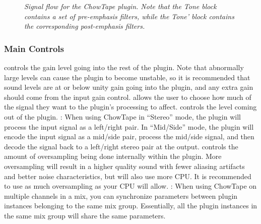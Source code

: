 \documentclass[landscape,twocolumn,a5paper]{manual}
\begin{document}
\begin{figure}
    \caption{\label{fig:tape_dsp}{\it Signal flow for the ChowTape plugin.
                                  Note that the Tone block contains a set
                                  of pre-emphasis filters, while the Tone'
                                  block contains the corresponding post-emphasis
                                  filters.}}
\end{figure}

\subsubsection{Main Controls}
 controls the gain level going into
the rest of the plugin. Note that abnormally large levels
can cause the plugin to become unstable, so it is recommended
that sound levels are at or below unity gain going into the
plugin, and any extra gain should come from the input gain
control.
\newpar
{} allows the user to choose how much of the
signal they want to the plugin's processing to affect.
\newpar
{} controls the level coming out of the plugin.
\newpar
{}: When using ChowTape in ``Stereo''
mode, the plugin will process the input signal as a left/right
pair. In ``Mid/Side'' mode, the plugin will encode the input
signal as a mid/side pair, process the mid/side signal, and
then decode the signal back to a left/right stereo pair at
the output.
\newpar
{} controls the amount of oversampling
being done internally within the plugin. More oversampling
will result in a higher quality sound with fewer aliasing
artifacts and better noise characteristics, but will also
use more CPU. It is recommended to use as much oversampling
as your CPU will allow.
\newpar
{}: When using ChowTape on multiple channels
in a mix, you can synchronize parameters between plugin
instances belonging to the same mix group. Essentially, all
the plugin instances in the same mix group will share the same
parameters.
\end{document}
